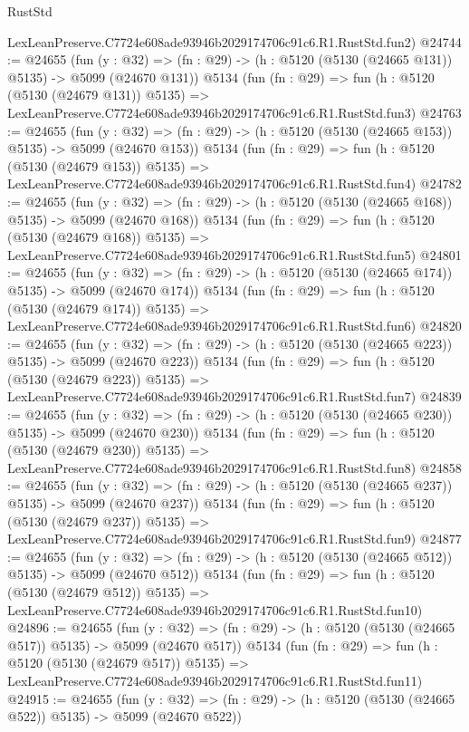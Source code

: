 \begin{lexlean}{RustStd}
\begin{coremodule}
    LexLeanPreserve.C7724e608ade93946b2029174706c91c6.R1.RustStd.fun2)
@24744 := @24655
    (fun (y : @32) => (fn : @29) -> (h : @5120 (@5130 (@24665 @131)) @5135) -> @5099 (@24670 @131))
    @5134
    (fun (fn : @29) =>
    fun (h : @5120 (@5130 (@24679 @131)) @5135) =>
    LexLeanPreserve.C7724e608ade93946b2029174706c91c6.R1.RustStd.fun3)
@24763 := @24655
    (fun (y : @32) => (fn : @29) -> (h : @5120 (@5130 (@24665 @153)) @5135) -> @5099 (@24670 @153))
    @5134
    (fun (fn : @29) =>
    fun (h : @5120 (@5130 (@24679 @153)) @5135) =>
    LexLeanPreserve.C7724e608ade93946b2029174706c91c6.R1.RustStd.fun4)
@24782 := @24655
    (fun (y : @32) => (fn : @29) -> (h : @5120 (@5130 (@24665 @168)) @5135) -> @5099 (@24670 @168))
    @5134
    (fun (fn : @29) =>
    fun (h : @5120 (@5130 (@24679 @168)) @5135) =>
    LexLeanPreserve.C7724e608ade93946b2029174706c91c6.R1.RustStd.fun5)
@24801 := @24655
    (fun (y : @32) => (fn : @29) -> (h : @5120 (@5130 (@24665 @174)) @5135) -> @5099 (@24670 @174))
    @5134
    (fun (fn : @29) =>
    fun (h : @5120 (@5130 (@24679 @174)) @5135) =>
    LexLeanPreserve.C7724e608ade93946b2029174706c91c6.R1.RustStd.fun6)
@24820 := @24655
    (fun (y : @32) => (fn : @29) -> (h : @5120 (@5130 (@24665 @223)) @5135) -> @5099 (@24670 @223))
    @5134
    (fun (fn : @29) =>
    fun (h : @5120 (@5130 (@24679 @223)) @5135) =>
    LexLeanPreserve.C7724e608ade93946b2029174706c91c6.R1.RustStd.fun7)
@24839 := @24655
    (fun (y : @32) => (fn : @29) -> (h : @5120 (@5130 (@24665 @230)) @5135) -> @5099 (@24670 @230))
    @5134
    (fun (fn : @29) =>
    fun (h : @5120 (@5130 (@24679 @230)) @5135) =>
    LexLeanPreserve.C7724e608ade93946b2029174706c91c6.R1.RustStd.fun8)
@24858 := @24655
    (fun (y : @32) => (fn : @29) -> (h : @5120 (@5130 (@24665 @237)) @5135) -> @5099 (@24670 @237))
    @5134
    (fun (fn : @29) =>
    fun (h : @5120 (@5130 (@24679 @237)) @5135) =>
    LexLeanPreserve.C7724e608ade93946b2029174706c91c6.R1.RustStd.fun9)
@24877 := @24655
    (fun (y : @32) => (fn : @29) -> (h : @5120 (@5130 (@24665 @512)) @5135) -> @5099 (@24670 @512))
    @5134
    (fun (fn : @29) =>
    fun (h : @5120 (@5130 (@24679 @512)) @5135) =>
    LexLeanPreserve.C7724e608ade93946b2029174706c91c6.R1.RustStd.fun10)
@24896 := @24655
    (fun (y : @32) => (fn : @29) -> (h : @5120 (@5130 (@24665 @517)) @5135) -> @5099 (@24670 @517))
    @5134
    (fun (fn : @29) =>
    fun (h : @5120 (@5130 (@24679 @517)) @5135) =>
    LexLeanPreserve.C7724e608ade93946b2029174706c91c6.R1.RustStd.fun11)
@24915 := @24655
    (fun (y : @32) => (fn : @29) -> (h : @5120 (@5130 (@24665 @522)) @5135) -> @5099 (@24670 @522))

\end{coremodule}
\end{lexlean}
